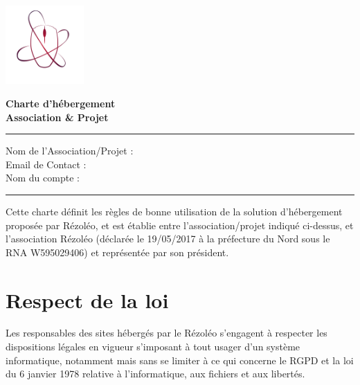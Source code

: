 \documentclass[11pt, a4paper]{article}
\begin{document}
\begin{center}
	\begin{minipage}{0.2\textwidth}
		\includegraphics[height=3cm]{rezoleo_logo.png}
	\end{minipage}
	\begin{minipage}{0.7\textwidth}
		\vspace{0.3cm}
		\Huge \textbf{Charte d'hébergement}\\
		\Huge \textbf{Association \& Projet}
	\end{minipage}
\end{center}

\vspace*{0.5cm}

\hrule
\vspace{.5cm}
\noindent Nom de l'Association/Projet : \dotfill
\vspace{.5cm}\\
Email de Contact : \dotfill
\vspace{.5cm}\\
Nom du compte : \dotfill\\
\hrule
\vspace{1cm}

\noindent Cette charte définit les règles de bonne utilisation de la solution d'hébergement proposée par Rézoléo, et est établie entre l'association/projet indiqué ci-dessus, et l'association Rézoléo (déclarée le 19/05/2017 à la préfecture du Nord sous le RNA W595029406) et représentée par son président.

\section{Respect de la loi}
Les responsables des sites hébergés par le Rézoléo s'engagent à respecter les dispositions légales en vigueur s'imposant à tout usager d'un système informatique, notamment mais sans se limiter à ce qui concerne le RGPD et la loi du 6 janvier 1978 relative à l'informatique, aux fichiers et aux libertés.
\end{document}
